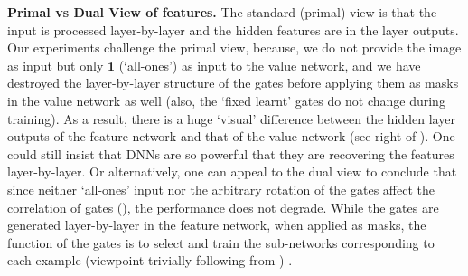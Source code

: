 
\textbf{Primal vs Dual View of features.} The standard (primal) view is that the input is processed layer-by-layer and the hidden features are in the layer outputs. 
Our experiments challenge the primal view, because, 
we do not provide the image as input but only $\mathbf{1}$ (`all-ones') as input to the value network, and we have destroyed the layer-by-layer structure of the gates before applying them as masks in the value network as well (also, the `fixed learnt' gates do not change during training). As a result, there is a huge `visual' difference between the hidden layer outputs of the feature network and that of the value network (see right of ).  One could still insist that DNNs are so powerful that they are recovering the features layer-by-layer. Or alternatively, one can appeal to the dual view to conclude that since neither `all-ones' input nor the arbitrary rotation of the gates affect the correlation of gates (), the performance does not degrade. While the gates are generated layer-by-layer in the feature network, when applied as masks, the function of the gates is to select and train the sub-networks corresponding to each example (viewpoint trivially following from ) .

